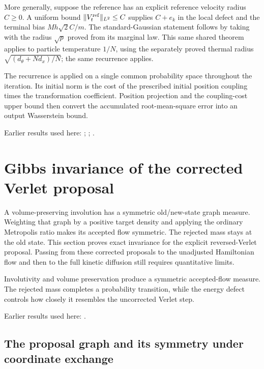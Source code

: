 \documentclass[11pt,a4paper]{report}
\begin{document}
More generally, suppose the reference has an explicit reference velocity radius \(C\ge0\). A uniform bound \(\|V_t^{\rm ref}\|_{L^2}\le C\) supplies \(C+e_k\) in the local defect and the terminal bias \(Mh\sqrt2C/m\). The standard-Gaussian statement follows by taking with the radius \(\sqrt p\) proved from its marginal law. This same shared theorem applies to particle temperature \(1/N\), using the separately proved thermal radius \(\sqrt{(d_\theta+Nd_x)/N}\); the same recurrence applies.



The recurrence is applied on a single common probability space throughout the iteration. Its initial norm is the cost of the prescribed initial position coupling times the transformation coefficient. Position projection and the coupling-cost upper bound then convert the accumulated root-mean-square error into an output Wasserstein bound.



Earlier results used here: \cite[Section~3.13.2]{LangevinLean2026ULASC}; \cite[Section~3.17.13]{LangevinLean2026ULASC}; \cite[Section~3.17.4]{LangevinLean2026ULASC}.
\section{\texorpdfstring{Gibbs invariance of the corrected Verlet proposal}{Gibbs invariance of the corrected Verlet proposal}}
\label{proof-module-KineticLangevin-HamiltonianMetropolis-lean}


A volume-preserving involution has a symmetric old/\allowbreak{}new-state graph measure. Weighting that graph by a positive target density and applying the ordinary Metropolis ratio makes its accepted flow symmetric. The rejected mass stays at the old state. This section proves exact invariance for the explicit reversed-Verlet proposal. Passing from these corrected proposals to the unadjusted Hamiltonian flow and then to the full kinetic diffusion still requires quantitative limits.



Involutivity and volume preservation produce a symmetric accepted-flow measure. The rejected mass completes a probability transition, while the energy defect controls how closely it resembles the uncorrected Verlet step.



Earlier results used here: \cite[Section~3.35]{LangevinLean2026ULASC}.
\subsection{\texorpdfstring{The proposal graph and its symmetry under coordinate exchange}{The proposal graph and its symmetry under coordinate exchange}}
\label{report-step-KineticLangevin-HamiltonianMetropolis-lean-1}
\end{document}
